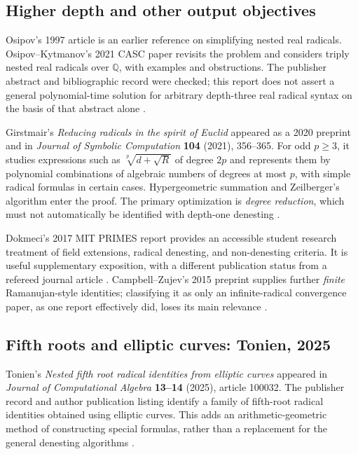 \documentclass[11pt,letterpaper]{article}
\numberwithin{equation}{section}
\theoremstyle{definition}
\theoremstyle{remark}
\newcommand{\Q}{\mathbb{Q}}
\begin{document}
\subsection{Higher depth and other output objectives}
Osipov's 1997 article is an earlier reference on simplifying nested real radicals. Osipov--Kytmanov's 2021 CASC paper revisits the problem and considers triply nested real radicals over $\Q$, with examples and obstructions. The publisher abstract and bibliographic record were checked; this report does not assert a general polynomial-time solution for arbitrary depth-three real radical syntax on the basis of that abstract alone \cite{osipov97,osipov21}.

Girstmair's \emph{Reducing radicals in the spirit of Euclid} appeared as a 2020 preprint and in \emph{Journal of Symbolic Computation} \textbf{104} (2021), 356--365. For odd $p\ge3$, it studies expressions such as $\sqrt[p]{d+\sqrt R}$ of degree $2p$ and represents them by polynomial combinations of algebraic numbers of degrees at most $p$, with simple radical formulas in certain cases. Hypergeometric summation and Zeilberger's algorithm enter the proof. The primary optimization is \emph{degree reduction}, which must not automatically be identified with depth-one denesting \cite{girstmair}.

Dokmeci's 2017 MIT PRIMES report provides an accessible student research treatment of field extensions, radical denesting, and non-denesting criteria. It is useful supplementary exposition, with a different publication status from a refereed journal article \cite{dokmeci}. Campbell--Zujev's 2015 preprint supplies further \emph{finite} Ramanujan-style identities; classifying it as only an infinite-radical convergence paper, as one report effectively did, loses its main relevance \cite{campbell}.

\subsection{Fifth roots and elliptic curves: Tonien, 2025}
Tonien's \emph{Nested fifth root radical identities from elliptic curves} appeared in \emph{Journal of Computational Algebra} \textbf{13--14} (2025), article 100032. The publisher record and author publication listing identify a family of fifth-root radical identities obtained using elliptic curves. This adds an arithmetic-geometric method of constructing special formulas, rather than a replacement for the general denesting algorithms \cite{tonien}.
\end{document}

